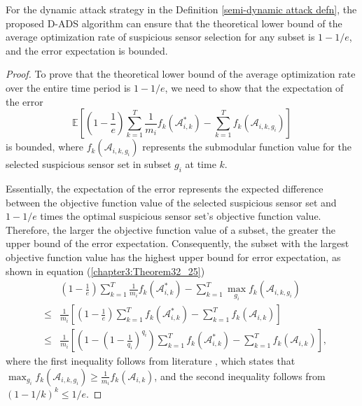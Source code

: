 \begin{theorem}\label{thm42}
    For the dynamic attack strategy in the Definition \ref{semi-dynamic attack defn}, the proposed D-ADS algorithm can ensure that the theoretical lower bound of the average optimization rate of suspicious sensor selection for any subset is $1-1/e$, and the error expectation is bounded.
\end{theorem}
\begin{proof}
To prove that the theoretical lower bound of the average optimization rate over the entire time period is 
$1 - 1/e$, 
we need to show that the expectation of the error 
\begin{equation}\label{chapter3:difference_between_real_and_predict}
\mathbb{E} \left[ \left( 1 - \frac{1}{e} \right) \sum_{k=1}^T{\frac{1}{m_i} f_k\left( \mathcal{A}_{i,k}^{*} \right)} - \sum_{k=1}^T{f_k( \mathcal{A}_{i,k,g_i} )} \right]  
\end{equation}
is bounded, where $f_k\left( \mathcal{A}_{i,k,g_i} \right)$ represents the submodular function value for the selected suspicious sensor set in subset $g_i$ at time $k$.

Essentially, the expectation of the error represents the expected difference between the objective function value of the selected suspicious sensor set and $1 - 1/e$ times the optimal suspicious sensor set's objective function value. Therefore, the larger the objective function value of a subset, the greater the upper bound of the error expectation. Consequently, the subset with the largest objective function value has the highest upper bound for error expectation, as shown in equation (\ref{chapter3:Theorem32_25})
\begin{eqnarray}\label{chapter3:Theorem32_25}
&&( 1 - \frac{1}{e} ) \sum_{k=1}^T{\frac{1}{m_i} f_k\left( \mathcal{A}_{i,k}^{*} \right)} - \sum_{k=1}^T{\max_{g_i} f_k( \mathcal{A}_{i,k,g_i} )} \nonumber\\ 
&\le& \frac{1}{m_i} \left[ (1 - \frac{1}{e}) \sum_{k=1}^T{ f_k\left( \mathcal{A}_{i,k}^{*} \right)} - \sum_{k=1}^T{ f_k( \mathcal{A}_{i,k} )} \right] \\
&\le&\frac{1}{m_i} \left[ (1 - (1 - \frac{1}{q_i})^{q_i})\sum_{k=1}^T{f_k\left( \mathcal{A}_{i,k}^{*} \right)} - \sum_{k=1}^T{f_k\left( \mathcal{A}_{i,k} \right)} \right],\nonumber
\end{eqnarray}
where the first inequality follows from literature \cite{mirzasoleiman2016distributed}, which states that $\max_{g_i} f_k(\mathcal{A}_{i,k,g_i}) \ge \frac{1}{m_i} f_k(\mathcal{A}_{i,k})$, and the second inequality follows from $(1 - 1/k)^{k} \le 1/e$. 


\end{proof}
